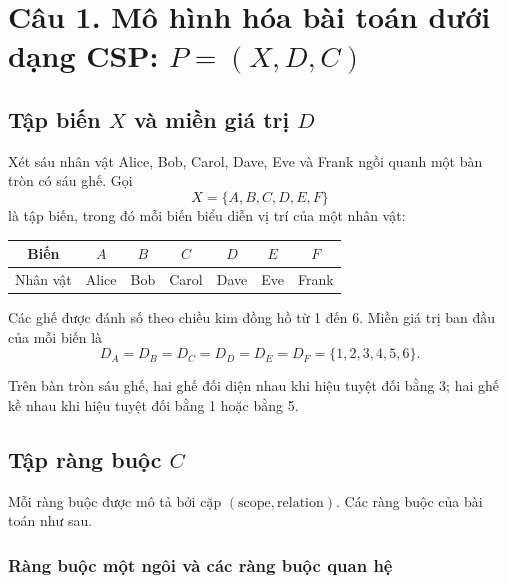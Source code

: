 \section{Câu 1. Mô hình hóa bài toán dưới dạng CSP: $P=(X,D,C)$}

\subsection{Tập biến $X$ và miền giá trị $D$}

Xét sáu nhân vật Alice, Bob, Carol, Dave, Eve và Frank ngồi quanh một bàn
tròn có sáu ghế. Gọi
\[
    X=\{A,B,C,D,E,F\}
\]
là tập biến, trong đó mỗi biến biểu diễn vị trí của một nhân vật:

\begin{center}
\begin{tabular}{c|cccccc}
    \toprule
    Biến & $A$ & $B$ & $C$ & $D$ & $E$ & $F$ \\
    \midrule
    Nhân vật & Alice & Bob & Carol & Dave & Eve & Frank \\
    \bottomrule
\end{tabular}
\end{center}

Các ghế được đánh số theo chiều kim đồng hồ từ 1 đến 6. Miền giá trị ban đầu
của mỗi biến là
\[
    D_A=D_B=D_C=D_D=D_E=D_F=\{1,2,3,4,5,6\}.
\]

Trên bàn tròn sáu ghế, hai ghế đối diện nhau khi hiệu tuyệt đối bằng 3; hai
ghế kề nhau khi hiệu tuyệt đối bằng 1 hoặc bằng 5.

\subsection{Tập ràng buộc $C$}

Mỗi ràng buộc được mô tả bởi cặp $(\text{scope},\text{relation})$. Các ràng
buộc của bài toán như sau.

\subsubsection{Ràng buộc một ngôi và các ràng buộc quan hệ}

